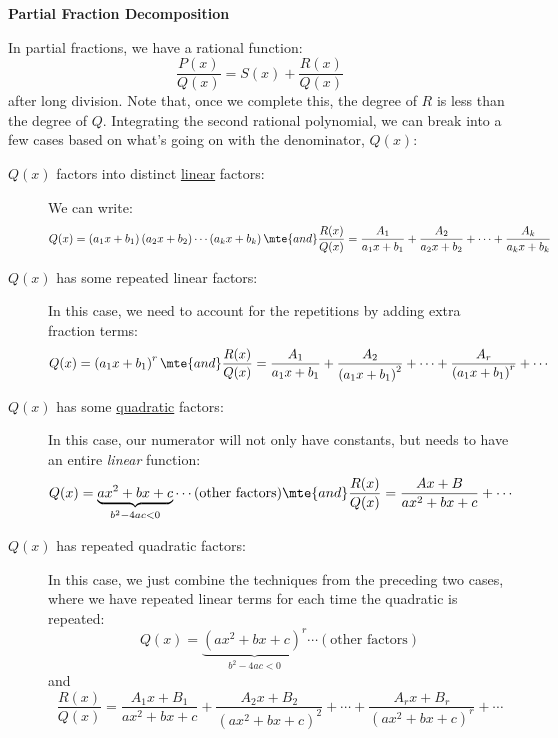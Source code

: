 
\chead{\today}
\graphicspath{ {\string~/Desktop} }
\usetikzlibrary{arrows}
\newcommand{\ans}[1]{ \noindent {\color{red} \textbf{Answer:} #1}}
\renewcommand{\ans}[1]{\vspace{3in}}

\begin{center}
\textbf{Partial Fraction Decomposition}
\end{center}
\begin{aun}
In partial fractions, we have a rational function:
\[
\frac{P(x)}{Q(x)} = S(x)+ \frac{R(x)}{Q(x)}
\]
after long division. Note that, once we complete this, the degree of $R$ is less than the degree of $Q$. Integrating the second rational polynomial, we can break into a few cases based on what's going on with the denominator, $Q(x)$:
\begin{description}
\item[$Q(x)$ factors into distinct \underline{linear} factors:] We can write:
\[
Q(x)=\left(a_1 x+b_1\right)\left(a_2 x+b_2\right) \cdots\left(a_k x+b_k\right) \mte{ and } \frac{R(x)}{Q(x)}=\frac{A_1}{a_1 x+b_1}+\frac{A_2}{a_2 x+b_2}+\cdots+\frac{A_k}{a_k x+b_k}
\]
\item[$Q(x)$ has some repeated linear factors:] In this case, we need to account for the repetitions by adding extra fraction terms:
\[
Q(x)=\left(a_1 x+b_1\right)^r \mte{ and }  \frac{R(x)}{Q(x)} = \frac{A_1}{a_1 x+b_1}+\frac{A_2}{\left(a_1 x+b_1\right)^2}+\cdots+\frac{A_r}{\left(a_1 x+b_1\right)^r} + \cdots 
\]
\item[$Q(x)$ has some \underline{quadratic} factors:] In this case, our numerator will not only have constants, but needs to have an entire \emph{linear} function:
\[
Q(x) = \underbrace{ax^2 + bx + c}_{b^2 - 4ac < 0} \cdots (\text{other factors})\mte{ and } \frac{R(x)}{Q(x)} =  \frac{A x+B}{a x^2+b x+c} + \cdots
\]
\item[$Q(x)$ has repeated quadratic factors:] In this case, we just combine the techniques from the preceding two cases, where we have repeated linear terms for each time the quadratic is repeated:
\[
Q(x) = \underbrace{(ax^2 + bx + c)^r}_{b^2 - 4ac < 0} \cdots (\text{other factors}) \]
and  
\[
\frac{R(x)}{Q(x)} = \frac{A_1x + B_1}{ax^2 + bx + c}+\frac{A_2x + B_2}{\left(ax^2 + bx + c\right)^2}+\cdots+\frac{A_rx + B_r}{\left(ax^2 + bx + c\right)^r} + \cdots 
\]
\end{description}
\label{pfd}
\end{aun}

